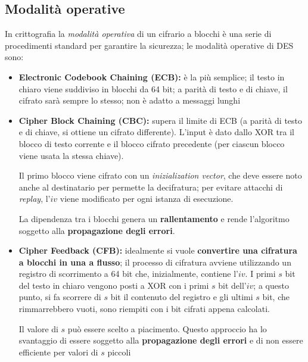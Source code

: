 \subsection{Modalità operative}

In crittografia la \textit{modalità operativa} di un cifrario a blocchi è una serie di procedimenti standard per garantire la sicurezza; le modalità 
operative di DES sono:
\begin{itemize}
    \item \textbf{Electronic Codebook Chaining (ECB):} è la più semplice; il testo in chiaro viene suddiviso in blocchi da 64 bit; a parità di testo 
    e di chiave, il cifrato sarà sempre lo stesso; non è adatto a messaggi lunghi 
    \item \textbf{Cipher Block Chaining (CBC):} supera il limite di ECB (a parità di testo e di chiave, si ottiene un cifrato differente). L'input è dato 
    dallo XOR tra il blocco di testo corrente e il blocco cifrato precedente (per ciascun blocco viene usata la stessa chiave).

    \noindent Il primo blocco viene cifrato con un  \textit{inizialization vector}, che deve essere noto anche al destinatario per permette la decifratura; per evitare attacchi 
    di \textit{replay}, l'$iv$ viene modificato per ogni istanza di esecuzione.

    \noindent La dipendenza tra i blocchi genera un \textbf{rallentamento} e rende l'algoritmo soggetto alla \textbf{propagazione degli errori}.

    \item \textbf{Cipher Feedback (CFB):} idealmente si vuole \textbf{convertire una cifratura a blocchi in una a flusso}; il processo di cifratura 
    avviene utilizzando un registro di scorrimento a 64 bit che, inizialmente, contiene l'$iv$. I primi $s$ bit del testo in chiaro vengono posti a XOR 
    con i primi $s$ bit dell'$iv$; a questo punto, si fa scorrere di $s$ bit il contenuto del registro e gli ultimi $s$ bit, che rimmarrebbero vuoti, sono 
    riempiti con i bit cifrati appena calcolati.

    \noindent Il valore di $s$ può essere scelto a piacimento. Questo approccio ha lo svantaggio di essere soggetto alla \textbf{propagazione degli errori}
    e di non essere efficiente per valori di $s$ piccoli
    

\end{itemize}
